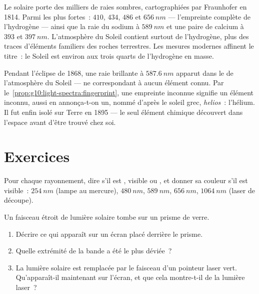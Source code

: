 \begin{example}\label{ex:g10:light-spectra:sunrecipe}
Le  solaire porte des milliers de raies sombres, cartographiées
par Fraunhofer en 1814. Parmi les plus fortes~: $410$, $434$, $486$ et
$\qty{656}{nm}$ --- l'empreinte complète de l'hydrogène --- ainsi que
la raie du sodium à $\qty{589}{nm}$ et une paire de calcium à $393$ et
$\qty{397}{nm}$. L'atmosphère du Soleil contient surtout de
l'hydrogène, plus des traces d'éléments familiers des roches
terrestres. Les mesures modernes affinent le titre~: le Soleil est
environ aux trois quarts de l'hydrogène en masse.
\end{example}

\begin{remark}\label{rem:g10:light-spectra:helium}
Pendant l'éclipse de 1868, une raie brillante à $\qty{587.6}{nm}$
apparut dans le  de l'atmosphère du Soleil --- ne correspondant
à aucun élément connu. Par le~\cref{prop:g10:light-spectra:fingerprint}, une
empreinte inconnue signifie un élément inconnu, aussi en annonça-t-on
un, nommé d'après le soleil grec, \emph{helios}~: l'hélium. Il fut
enfin isolé sur Terre en 1895 --- le seul élément chimique découvert
dans l'espace avant d'être trouvé chez soi.
\end{remark}

\section{Exercices}

\begin{exercise}[$\star$]\label{exo:g10:light-spectra:1}
Pour chaque rayonnement, dire s'il est , visible ou
, et donner sa couleur s'il est visible~:
$\qty{254}{nm}$ (lampe au mercure), $\qty{480}{nm}$, $\qty{589}{nm}$,
$\qty{656}{nm}$, $\qty{1064}{nm}$ (laser de découpe).
\end{exercise}

\begin{exercise}[$\star$]\label{exo:g10:light-spectra:2}
Un faisceau étroit de lumière solaire tombe sur un prisme de verre.
\begin{enumerate}
  \item Décrire ce qui apparaît sur un écran placé derrière le prisme.
  \item Quelle extrémité de la bande a été le plus déviée~?
  \item La lumière solaire est remplacée par le faisceau d'un pointeur
        laser vert. Qu'apparaît-il maintenant sur l'écran, et que cela
        montre-t-il de la lumière laser~?
\end{enumerate}
\end{exercise}

